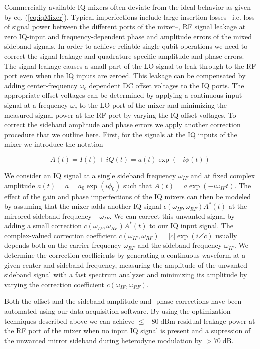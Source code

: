Commercially available IQ mixers often deviate from the ideal behavior as given by eq. (\ref{eq:iqMixer}). Typical imperfections include large insertion losses --i.e. loss of signal power between the different ports of the mixer--, RF signal leakage at zero IQ-input and frequency-dependent phase and amplitude errors of the mixed sideband signals. In order to achieve reliable single-qubit operations we need to correct the signal leakage and quadrature-specific amplitude and phase errors. The signal leakage causes a small part of the LO signal to leak through to the RF port even when the IQ inputs are zeroed. This leakage can be compensated by adding center-frequency $\omega_c$ dependent DC offset voltages to the IQ ports. The appropriate offset voltages can be determined by applying a continuous input signal at a frequency $\omega_c$ to the LO port of the mixer and minimizing the measured signal power at the RF port by varying the IQ offset voltages. To correct the sideband amplitude and phase errors we apply another correction procedure that we outline here. First, for the signals at the IQ inputs of the mixer we introduce the notation

\begin{equation}
A(t) = I(t)+iQ(t) = a(t)\exp{(-i\phi(t))} \label{eq:iq_if_input}
\end{equation}

We consider an IQ signal at a single sideband frequency $\omega_{IF}$ and at fixed complex amplitude $a(t) = a = a_0\exp{(i\phi_0)}$ such that $A(t) = a\exp{(-i \omega_{IF} t)}$. The effect of the gain and phase imperfections of the IQ mixers can then be modeled by assuming that the mixer adds another IQ signal $\epsilon(\omega_{IF},\omega_{RF})A^*(t)$ at the mirrored sideband frequency $-\omega_{IF}$. We can correct this unwanted signal by adding a small correction $c(\omega_{IF},\omega_{RF})A^*(t)$ to our IQ input signal. The complex-valued correction coefficient $c(\omega_{IF},\omega_{RF})=|c|\exp{(i\angle c)}$ usually depends both on the carrier frequency $\omega_{RF}$ and the sideband frequency $\omega_{IF}$. We determine the correction coefficients by generating a continuous waveform at a given center and sideband frequency, measuring the amplitude of the unwanted sideband signal with a fast spectrum analyzer and minimizing its amplitude by varying the correction coefficient $c(\omega_{IF},\omega_{RF})$.

Both the offset and the sideband-amplitude and -phase corrections have been automated using our data acquisition software. By using the optimization techniques described above we can achieve $\le-80\;\mathrm{dBm}$ residual leakage power at the RF port of the mixer when no input IQ signal is present and a supression of the unwanted mirror sideband during heterodyne modulation by $>70\;\mathrm{dB}$.

